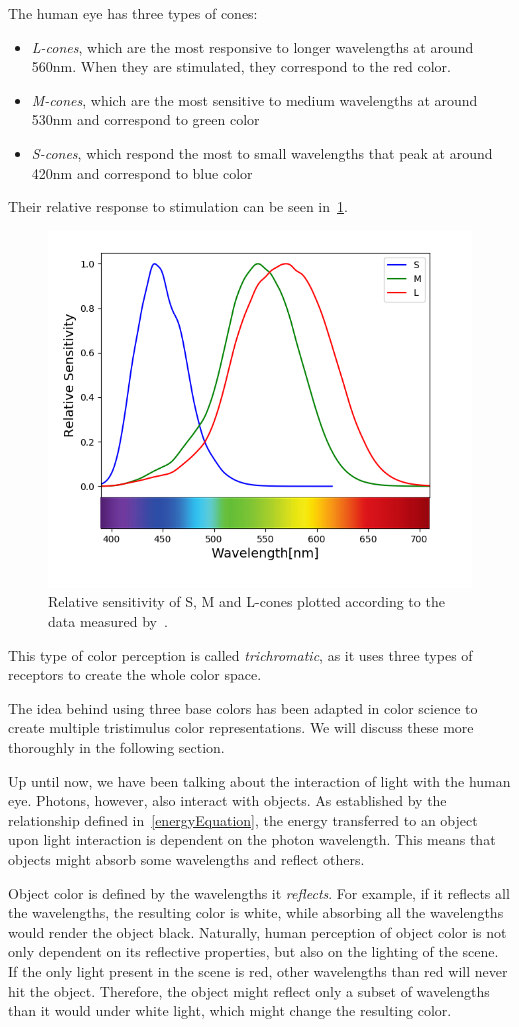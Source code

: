 The human eye has three types of cones:
\begin{itemize}
	\item \emph{L-cones}, which are the most responsive to longer wavelengths at around 560nm. When they are stimulated, they correspond to the red color.
	\item \emph{M-cones}, which are the most sensitive to medium wavelengths at around 530nm and correspond to green color
	\item \emph{S-cones}, which respond the most to small wavelengths that peak at around 420nm and correspond to blue color
\end{itemize}

Their relative response to stimulation can be seen in~\cref{fig:coneSensitivity}.
\begin{figure}[t]
	\centering
	\includegraphics[width=0.5\linewidth]{img/cone_sensitivity.png}
	\caption{Relative sensitivity of S, M and L-cones plotted according to the data measured by~\citet{coneSensitivities}.} \label{fig:coneSensitivity}
\end{figure}

This type of color perception is called \emph{trichromatic}, as it uses three types of receptors to create the whole color space.

The idea behind using three base colors has been adapted in color science to create multiple tristimulus color representations. We will discuss these more thoroughly in the following section.

Up until now, we have been talking about the interaction of light with the human eye. Photons, however, also interact with objects. As established by the relationship defined in~\cref{energyEquation}, the energy transferred to an object upon light interaction is dependent on the photon wavelength. This means that objects might absorb some wavelengths and reflect others.

Object color is defined by the wavelengths it \emph{reflects}. For example, if it reflects all the wavelengths, the resulting color is white, while absorbing all the wavelengths would render the object black. Naturally, human perception of object color is not only dependent on its reflective properties, but also on the lighting of the scene. If the only light present in the scene is red, other wavelengths than red will never hit the object. Therefore, the object might reflect only a subset of wavelengths than it would under white light, which might change the resulting color.

